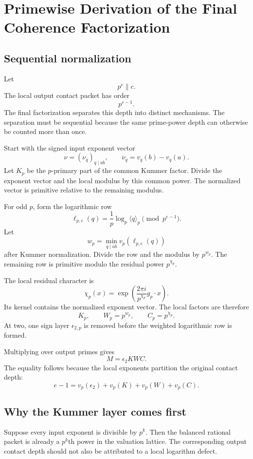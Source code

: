 \chapter{Primewise Derivation of the Final Coherence Factorization}

\section{Sequential normalization}
Let
\[
 p^e\parallel c.
\]
The local output contact packet has order
\[
 p^{e-1}.
\]
The final factorization separates this depth into distinct mechanisms. The separation must be sequential because the same prime-power depth can otherwise be counted more than once.

Start with the signed input exponent vector
\[
 \nu=(\nu_q)_{q\mid ab},
 \qquad
 \nu_q=v_q(b)-v_q(a).
\]
Let $K_p$ be the $p$-primary part of the common Kummer factor. Divide the exponent vector and the local modulus by this common power. The normalized vector is primitive relative to the remaining modulus.

For odd $p$, form the logarithmic row
\[
 \ell_{p,e}(q)
 =
 \frac1p\log_p\langle q\rangle_p
 \pmod{p^{e-1}}.
\]
Let
\[
 w_p
 =
 \min_{q\mid ab}
 v_p(\ell_{p,e}(q))
\]
after Kummer normalization. Divide the row and the modulus by $p^{w_p}$. The remaining row is primitive modulo the residual power $p^{\chi_p}$.

The local residual character is
\[
 \chi_p(x)
 =
 \exp\left(
 \frac{2\pi i}{p^{\chi_p}}g_p\cdot x
 \right).
\]
Its kernel contains the normalized exponent vector. The local factors are therefore
\[
 K_p,
 \qquad
 W_p=p^{w_p},
 \qquad
 C_p=p^{\chi_p}.
\]
At two, one sign layer $\epsilon_{2,p}$ is removed before the weighted logarithmic row is formed.

Multiplying over output primes gives
\[
 \boxed{
 M=\epsilon_2KWC.
 }
\]
The equality follows because the local exponents partition the original contact depth:
\[
 e-1
 =
 v_p(\epsilon_2)
 +
 v_p(K)
 +
 v_p(W)
 +
 v_p(C).
\]

\section{Why the Kummer layer comes first}
Suppose every input exponent is divisible by $p^k$. Then the balanced rational packet is already a $p^k$th power in the valuation lattice. The corresponding output contact depth should not also be attributed to a local logarithm defect.

